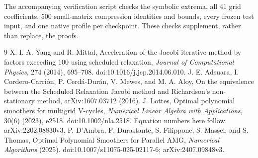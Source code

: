 \documentclass[11pt]{article}
\begin{document}
The accompanying verification script checks the symbolic extrema,
all 41 grid coefficients, 500 small-matrix compression identities and
bounds, every frozen test input, and one native profile per checkpoint.
These checks supplement, rather than replace, the proofs.

\begin{thebibliography}{9}
X. I. A. Yang and R. Mittal,
Acceleration of the Jacobi iterative method by factors exceeding 100
using scheduled relaxation,
\emph{Journal of Computational Physics}, 274 (2014), 695--708.
doi:10.1016/j.jcp.2014.06.010.
J. E. Adsuara, I. Cordero-Carri\'on, P. Cerd\'a-Dur\'an, V. Mewes,
and M. A. Aloy,
On the equivalence between the Scheduled Relaxation Jacobi method
and Richardson's non-stationary method, arXiv:1607.03712 (2016).
J. Lottes, Optimal polynomial smoothers for multigrid V-cycles,
\emph{Numerical Linear Algebra with Applications}, 30(6) (2023), e2518.
doi:10.1002/nla.2518. Equation numbers here follow arXiv:2202.08830v3.
P. D'Ambra, F. Durastante, S. Filippone, S. Massei, and S. Thomas,
Optimal Polynomial Smoothers for Parallel AMG,
\emph{Numerical Algorithms} (2025).
doi:10.1007/s11075-025-02117-6; arXiv:2407.09848v3.
\end{thebibliography}
\end{document}
